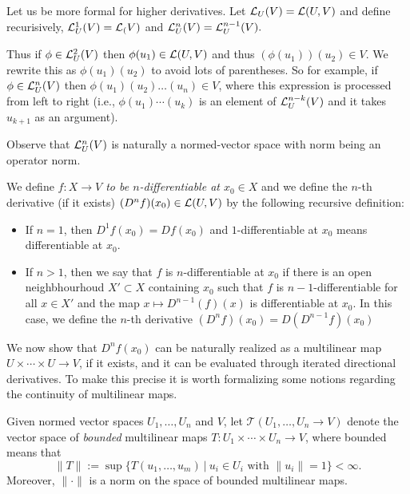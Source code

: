 \documentclass[twoside, a4paper, 10pt]{amsart}
\begin{document}
Let us be more formal for higher derivatives. Let $\mathcal{L}_{U}(V) = \mathcal{L}(U,V)$ and define recurisively, $\mathcal{L}^1_{U}(V) = \mathcal{L}_(V)$ and $\mathcal{L}^n_{U}(V) = \mathcal{L}^{n-1}_{U}(V).$ 

Thus if $\phi \in \mathcal{L}^2_{U}(V)$ then $\phi(u_1) \in \mathcal{L}(U,V)$ and thus $(\phi(u_1))(u_2) \in V$. We rewrite this as $\phi(u_1)(u_2)$ to avoid lots of parentheses. So for example, if $\phi \in \mathcal{L}^n_U(V)$ then $\phi(u_1)(u_2) \dots (u_n) \in V$, where this expression is processed from left to right (i.e., $\phi(u_1) \cdots (u_k)$ is an element of $\mathcal{L}^{n-k}_U(V)$ and it takes $u_{k+1}$ as an argument).

Observe that $\mathcal{L}^n_U(V)$ is naturally a normed-vector space with norm being an operator norm.

\begin{mydef} We define \textit{$f:X \to V$ to be $n$-differentiable at $x_0 \in X$} and we define the $n$-th derivative (if it exists) $(D^nf)(x_0) \in \mathcal{L}(U,V)$ by the following recursive definition:

\begin{itemize} 
	\item If $n=1$, then $D^1f(x_0) = Df(x_0)$ and $1$-differentiable at $x_0$ means differentiable at $x_0$.
	\item If $n>1$, then we say that $f$ is $n$-differentiable at $x_0$ if there is an open neighbhourhoud $X' \subset X$ containing $x_0$ such that $f$ is $n-1$-differentiable for all $x \in X'$ and the map $x \mapsto D^{n-1}(f)(x)$ is differentiable at $x_0$. In this case, we define the $n$-th derivative $(D^{n}f) (x_0) = D(D^{n-1}f)(x_0)$

\end{itemize}

\end{mydef}

We now show that $D^n f(x_0)$ can be naturally realized as a multilinear map $U \times \cdots \times U \to V$, if it exists, and it can be evaluated through iterated directional derivatives. To make this precise it is worth formalizing some notions regarding the continuity of multilinear maps.

\begin{mydef} Given normed vector spaces $U_1, \ldots, U_n$ and $V$, let $\mathcal{T}(U_1, \ldots, U_n \to V)$ denote the vector space of \textit{bounded} multilinear maps $T: U_1 \times \cdots \times U_n \to V$, where bounded means that $$\| T \| := \sup \{ T(u_1, \ldots, u_m) ~|~ u_i \in U_i \text{ with } \|u_i \| = 1 \} < \infty.$$ Moreover, $\| \cdot \|$ is a norm on the space of bounded multilinear maps.  \end{mydef}
\end{document}
